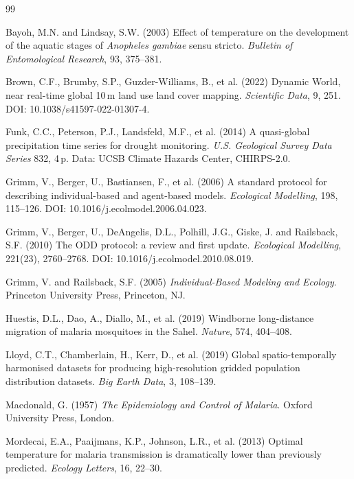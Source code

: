 \documentclass[11pt,a4paper]{article}
\begin{document}
\begin{thebibliography}{99}

Bayoh, M.N. and Lindsay, S.W. (2003)
Effect of temperature on the development of the aquatic stages of
\emph{Anopheles gambiae} sensu stricto.
\emph{Bulletin of Entomological Research}, 93, 375--381.

Brown, C.F., Brumby, S.P., Guzder-Williams, B., et al. (2022)
Dynamic World, near real-time global 10\,m land use land cover mapping.
\emph{Scientific Data}, 9, 251.
DOI: 10.1038/s41597-022-01307-4.

Funk, C.C., Peterson, P.J., Landsfeld, M.F., et al. (2014)
A quasi-global precipitation time series for drought monitoring.
\emph{U.S. Geological Survey Data Series} 832, 4\,p.
Data: UCSB Climate Hazards Center, CHIRPS-2.0.

Grimm, V., Berger, U., Bastiansen, F., et al. (2006)
A standard protocol for describing individual-based and agent-based models.
\emph{Ecological Modelling}, 198, 115--126.
DOI: 10.1016/j.ecolmodel.2006.04.023.

Grimm, V., Berger, U., DeAngelis, D.L., Polhill, J.G., Giske, J. and
Railsback, S.F. (2010)
The ODD protocol: a review and first update.
\emph{Ecological Modelling}, 221(23), 2760--2768.
DOI: 10.1016/j.ecolmodel.2010.08.019.

Grimm, V. and Railsback, S.F. (2005)
\emph{Individual-Based Modeling and Ecology}.
Princeton University Press, Princeton, NJ.

Huestis, D.L., Dao, A., Diallo, M., et al. (2019)
Windborne long-distance migration of malaria mosquitoes in the Sahel.
\emph{Nature}, 574, 404--408.

Lloyd, C.T., Chamberlain, H., Kerr, D., et al. (2019)
Global spatio-temporally harmonised datasets for producing high-resolution
gridded population distribution datasets.
\emph{Big Earth Data}, 3, 108--139.

Macdonald, G. (1957)
\emph{The Epidemiology and Control of Malaria}.
Oxford University Press, London.

Mordecai, E.A., Paaijmans, K.P., Johnson, L.R., et al. (2013)
Optimal temperature for malaria transmission is dramatically lower than
previously predicted.
\emph{Ecology Letters}, 16, 22--30.


\end{thebibliography}
\end{document}
